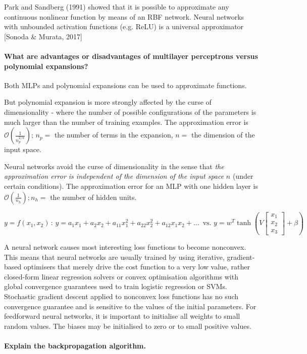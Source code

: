 Park and Sandberg (1991) showed that it is possible to approximate any
continuous nonlinear function by means of an RBF network.
Neural networks with unbounded activation functions (e.g. ReLU)
is a universal approximator [Sonoda \& Murata, 2017]

\paragraph{What are advantages or disadvantages of multilayer perceptrons versus polynomial expansions?}

Both MLPs and polynomial expansions can be used to approximate functions.

But polynomial expansion is more strongly affected by the curse of dimensionality - where the number of possible configurations of the parameters is much larger than the number of training examples.
The approximation error is $\mathcal{O}(\frac{1}{n_p^{2/n}}); \, n_p =$ the number of terms in the expansion, $n =$ the dimension of the input space.

Neural networks avoid the curse of dimensionality in the sense that
\textit{the approximation error is independent of the dimension of the input space} $n$
(under certain conditions).
The approximation error for an MLP with one hidden layer is $\mathcal{O}(\frac{1}{n_h}); n_h =$ the number of hidden units.

$$y = f(x_1, x_2) \, : \, y = a_1 x_1 + a_2 x_2 + a_{11} x_1^2 + a_{22} x_2^2 + a_{12} x_1 x_2 + \dots \, \text{ vs. } y = w^T \tanh(V \begin{bmatrix}
    x_1 \\ x_2 \\ x_3
\end{bmatrix} + \beta)$$

A neural network causes most interesting loss functions to become nonconvex.
This means that neural networks are usually trained by using iterative, gradient-based optimisers that merely drive the cost function to a very low value, rather closed-form linear regression solvers or convex optimisation algorithms with global convergence guarantees used to train logistic regression or SVMs.
Stochastic gradient descent applied to nonconvex loss functions has no such convergence guarantee and is sensitive to the values of the initial parameters.
For feedforward neural networks, it is important to initialise all weights to small random values. The biases may be initialised to zero or to small positive values.

\paragraph{Explain the backpropagation algorithm.}

